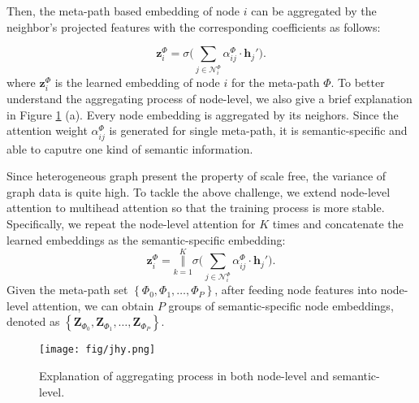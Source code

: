 Then, the meta-path based embedding of node $i$ can be aggregated by the neighbor's projected features with the corresponding coefficients as follows:

\begin{equation}
\mathbf{z}^{\Phi}_i=\sigma \biggl( \sum_{j \in \mathcal{N}_i^{\Phi}} \alpha_{ij}^{\Phi} \cdot \mathbf{h}_j'  \biggr).
\label{node_agg}
\end{equation}
where $\mathbf{z}^{\Phi}_i$ is the learned embedding of node $i$ for the meta-path $\Phi$. 
To better understand the aggregating process of node-level, we also give a brief explanation in Figure \ref{fig_explain} (a). Every node embedding is aggregated by its neighors.
Since the attention weight $\alpha_{ij}^{\Phi}$ is generated for single meta-path, it is semantic-specific and able to caputre one kind of semantic information.


Since heterogeneous graph present the property of scale free,
the variance of graph data is quite high.
To tackle the above challenge,
we extend node-level attention to multihead attention so that the training process is more stable. Specifically, we repeat the node-level attention for $K$ times 
and concatenate the learned embeddings as the semantic-specific embedding:
\begin{equation}
\mathbf{z}^{\Phi}_i=
\overset{K}{\underset{k=1}{\Vert}}
\sigma \biggl( \sum_{j \in \mathcal{N}_i^{\Phi}} \alpha_{ij}^{\Phi} \cdot \mathbf{h}_j'  \biggr).
\end{equation}
Given the meta-path set  $\left\lbrace \Phi_0,\Phi_1,\ldots,\Phi_{P}\right\rbrace $, after feeding node features into node-level attention, 
we can obtain $P$ groups of semantic-specific node embeddings, 
denoted as $\left\lbrace \mathbf{Z}_{\Phi_0},\mathbf{Z}_{\Phi_1},\ldots,\mathbf{Z}_{\Phi_{P}}\right\rbrace $.


\begin{figure}
	\centering
\texttt{[image: fig/jhy.png]}
	
	\caption{Explanation of aggregating process in both node-level and semantic-level.}
	\label{fig_explain}
\end{figure}



